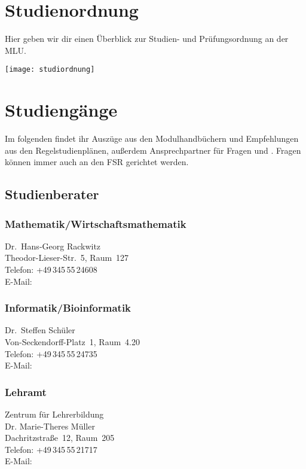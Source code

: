 
\section{Studienordnung}
Hier geben wir dir einen Überblick
zur Studien- und Prüfungsordnung an der MLU.
\begin{center}
	\texttt{[image: studiordnung]}
\end{center}

\section{Studiengänge}

Im folgenden findet ihr Auszüge aus den Modulhandbüchern und Empfehlungen aus den Regelstudienplänen, außerdem Ansprechpartner für Fragen und .
Fragen können immer auch an den FSR gerichtet werden.

\subsection{Studienberater}
\subsubsection{Mathematik/Wirtschaftsmathematik}
Dr.\ Hans-Georg Rackwitz \\
Theodor-Lieser-Str.~5, Raum~127 \\
Telefon: +49\,345\,55\,24608\\
E-Mail: \\

\subsubsection{Informatik/Bioinformatik}
Dr.\ Steffen Schüler \\
Von-Seckendorff-Platz~1, Raum~4.20 \\
Telefon: +49\,345\,55\,24735 \\
E-Mail: 

\subsubsection{Lehramt}
Zentrum für Lehrerbildung \\
Dr. Marie-Theres Müller \\
Dachritzstraße~12, Raum~205 \\
Telefon: +49\,345\,55\,21717 \\
E-Mail: 

